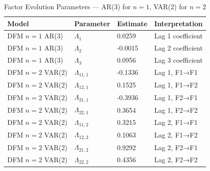\begin{table}[h]\centering
\caption{Factor Evolution Parameters — AR(3) for $n=1$, VAR(2) for $n=2$}
\begin{tabular}{llll}
\toprule
Model & Parameter & Estimate & Interpretation \\
\midrule
DFM $n=1$ AR(3) & $\Lambda_{1}$ & 0.0259 & Lag 1 coefficient \\
DFM $n=1$ AR(3) & $\Lambda_{2}$ & -0.0015 & Lag 2 coefficient \\
DFM $n=1$ AR(3) & $\Lambda_{3}$ & 0.0956 & Lag 3 coefficient \\
DFM $n=2$ VAR(2) & $\Lambda_{11,1}$ & -0.1336 & Lag 1, F1→F1 \\
DFM $n=2$ VAR(2) & $\Lambda_{12,1}$ & 0.1525 & Lag 1, F1→F2 \\
DFM $n=2$ VAR(2) & $\Lambda_{21,1}$ & -0.3936 & Lag 1, F2→F1 \\
DFM $n=2$ VAR(2) & $\Lambda_{22,1}$ & 0.3654 & Lag 1, F2→F2 \\
DFM $n=2$ VAR(2) & $\Lambda_{11,2}$ & 0.3215 & Lag 2, F1→F1 \\
DFM $n=2$ VAR(2) & $\Lambda_{12,2}$ & 0.1063 & Lag 2, F1→F2 \\
DFM $n=2$ VAR(2) & $\Lambda_{21,2}$ & 0.9292 & Lag 2, F2→F1 \\
DFM $n=2$ VAR(2) & $\Lambda_{22,2}$ & 0.4356 & Lag 2, F2→F2 \\
\bottomrule
\end{tabular}
\end{table}
